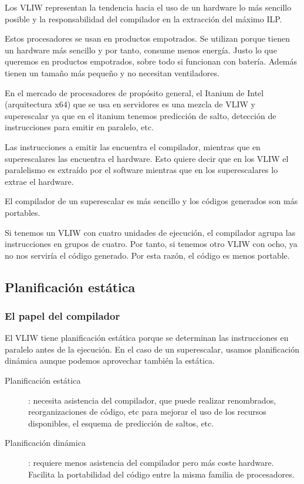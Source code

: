 \documentclass[10pt,a4paper,spanish]{report}
\begin{document}
Los VLIW representan la tendencia hacia el uso de un hardware lo más sencillo posible y la responsabilidad del compilador en la extracción del máximo ILP.

Estos procesadores se usan en productos empotrados. Se utilizan porque tienen un hardware más sencillo y por tanto, consume menos energía. Justo lo que queremos en productos empotrados, sobre todo si funcionan con batería. Además tienen un tamaño más pequeño y no necesitan ventiladores.

En el mercado de procesadores de propósito general, el Itanium de Intel (arquitectura x64) que se usa en servidores es una mezcla de VLIW y superescalar ya que en el itanium tenemos predicción de salto, detección de instrucciones para emitir en paralelo, etc.

Las instrucciones a emitir las encuentra el compilador, mientras que en superescalares las encuentra el hardware. Esto quiere decir que en los VLIW el paralelismo es extraído por el software mientras que en los superescalares lo extrae el hardware. 

El compilador de un superescalar es más sencillo y los códigos generados son más portables. 

Si tenemos un VLIW con cuatro unidades de ejecución, el compilador agrupa las instrucciones en grupos de cuatro. Por tanto, si tenemos otro VLIW con ocho, ya no nos serviría el código generado. Por esta razón, el código es menos portable.

\textcolor{azul}{\subsection{Planificación estática}}
\textcolor{azul}{\subsubsection{El papel del compilador}}
El VLIW tiene planificación estática porque se determinan las instrucciones en paralelo antes de la ejecución. En el caso de un superescalar, usamos planificación dinámica aunque podemos aprovechar también la estática.

\begin{description}
    \item[Planificación estática]: necesita asistencia del compilador, que puede realizar renombrados, reorganizaciones de código, etc para mejorar el uso de los recursos disponibles, el esquema de predicción de saltos, etc.

    \item[Planificación dinámica]: requiere menos asistencia del compilador pero más coste hardware. Facilita la portabilidad del código entre la misma familia de procesadores. 
\end{description}
\end{document}
